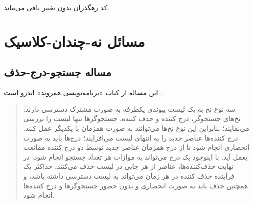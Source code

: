 \documentclass{book}
\newcommand{\clearemptydoublepage}{\newpage\cleardoublepage}
\begin{document}
    کد رهگذران بدون تغییر باقی می‌ماند. 
    


\clearemptydoublepage
\chapter{مسائل نه-چندان-کلاسیک}


\section{مساله جستجو-درج-حذف}

    این مساله از کتاب «برنامه‌نویسی همروند» اندرو است \cite{andrews}.

\begin {quotation}
    سه نوع نخ به یک لیست پیوندی یکطرفه به صورت مشترک دسترسی دارند: 
    نخ‌های جستجوگر، درج‌ کننده‌ و حذف کننده.  جستجوگرها تنها لیست را بررسی می‌نمایند؛ بنابراین این نوع نخ‌ها می‌توانند به صورت همزمان با یکدیگر 
    عمل کنند. درج کننده‌ها عناصر جدید را به انتهای لیست می‌افزایند؛ درج‌ها باید به صورت انحصاری انجام شود تا  از درج همزمان عناصر جدید توسط 
    دو درج کننده ممانعت بعمل آید. با اینوجود یک درج می‌تواند به موازات هر تعداد جستجو انجام شود. 
    در نهایت حذف‌کننده‌ها، عناصر از هر جایی در لیست حذف می‌کنند. 
    حداکثر یک فرآینده حذف کننده در  هر زمان می‌تواند به لیست دسترسی داشته باشد، و همچنین حذف باید به صورت انحصاری 
    و بدون حضور جستجوگرها و درج کننده‌ها انجام شود. 
\end{quotation}
\end{document}
